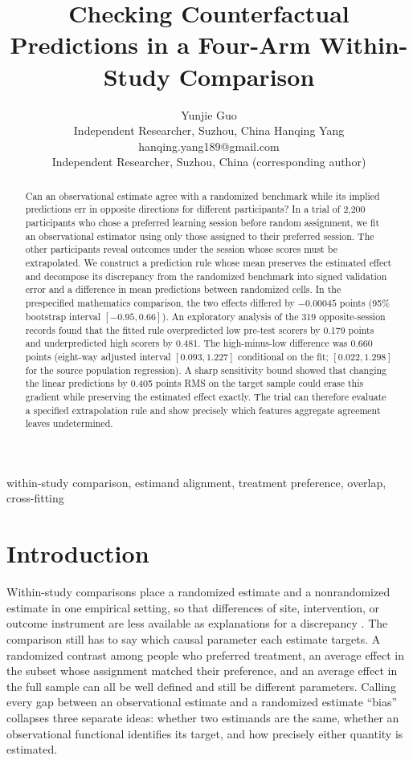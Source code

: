 \documentclass[twoside,11pt]{article}
\title{Checking Counterfactual Predictions in a Four-Arm Within-Study Comparison}
\author{\name Yunjie Guo \\
  \addr Independent Researcher, Suzhou, China
  \AND \name Hanqing Yang \email hanqing.yang189@gmail.com \\
  \addr Independent Researcher, Suzhou, China (corresponding author)}
\date{}
\begin{document}
\maketitle
\thispagestyle{plain}

\begin{abstract}%
Can an observational estimate agree with a randomized benchmark while its implied predictions err in opposite directions for different participants? In a trial of 2,200 participants who chose a preferred learning session before random assignment, we fit an observational estimator using only those assigned to their preferred session. The other participants reveal outcomes under the session whose scores must be extrapolated. We construct a prediction rule whose mean preserves the estimated effect and decompose its discrepancy from the randomized benchmark into signed validation error and a difference in mean predictions between randomized cells. In the prespecified mathematics comparison, the two effects differed by $-0.00045$ points (95\% bootstrap interval $[-0.95,0.66]$). An exploratory analysis of the 319 opposite-session records found that the fitted rule overpredicted low pre-test scorers by 0.179 points and underpredicted high scorers by 0.481. The high-minus-low difference was 0.660 points (eight-way adjusted interval $[0.093,1.227]$ conditional on the fit; $[0.022,1.298]$ for the source population regression). A sharp sensitivity bound showed that changing the linear predictions by 0.405 points RMS on the target sample could erase this gradient while preserving the estimated effect exactly. The trial can therefore evaluate a specified extrapolation rule and show precisely which features aggregate agreement leaves undetermined.
\end{abstract}

\begin{keywords}
within-study comparison, estimand alignment, treatment preference, overlap, cross-fitting
\end{keywords}

\section{Introduction}
\label{sec:intro}

Within-study comparisons place a randomized estimate and a nonrandomized estimate in one empirical setting, so that differences of site, intervention, or outcome instrument are less available as explanations for a discrepancy \citep{cook2008,keller2025,wongsteiner2018}. The comparison still has to say which causal parameter each estimate targets. A randomized contrast among people who preferred treatment, an average effect in the subset whose assignment matched their preference, and an average effect in the full sample can all be well defined and still be different parameters. Calling every gap between an observational estimate and a randomized estimate ``bias'' collapses three separate ideas: whether two estimands are the same, whether an observational functional identifies its target, and how precisely either quantity is estimated.
\end{document}
